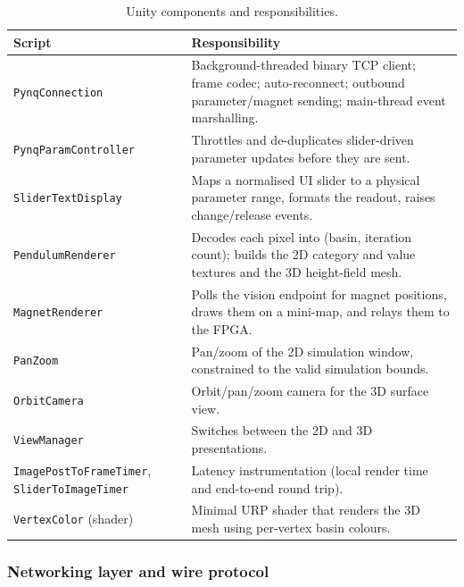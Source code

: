 \documentclass[11pt,a4paper]{article}
\begin{document}
\begin{table}[h]
\centering
\caption{Unity components and responsibilities.}
\label{tab:scripts}
\small
\begin{tabular}{@{}lp{10.4cm}@{}}
\toprule
\textbf{Script} & \textbf{Responsibility} \\
\midrule
\texttt{PynqConnection} & Background-threaded binary TCP client; frame
codec; auto-reconnect; outbound parameter/magnet sending; main-thread event
marshalling. \\
\texttt{PynqParamController} & Throttles and de-duplicates slider-driven
parameter updates before they are sent. \\
\texttt{SliderTextDisplay} & Maps a normalised UI slider to a physical
parameter range, formats the readout, raises change/release events. \\
\texttt{PendulumRenderer} & Decodes each pixel into (basin, iteration count);
builds the 2D category and value textures and the 3D height-field mesh. \\
\texttt{MagnetRenderer} & Polls the vision endpoint for magnet positions,
draws them on a mini-map, and relays them to the FPGA. \\
\texttt{PanZoom} & Pan/zoom of the 2D simulation window, constrained to the
valid simulation bounds. \\
\texttt{OrbitCamera} & Orbit/pan/zoom camera for the 3D surface view. \\
\texttt{ViewManager} & Switches between the 2D and 3D presentations. \\
\texttt{ImagePostToFrameTimer}, \texttt{SliderToImageTimer} & Latency
instrumentation (local render time and end-to-end round trip). \\
\texttt{VertexColor} (shader) & Minimal URP shader that renders the 3D mesh
using per-vertex basin colours. \\
\bottomrule
\end{tabular}
\end{table}

\subsubsection{Networking layer and wire protocol}
\label{sec:protocol}
\end{document}
